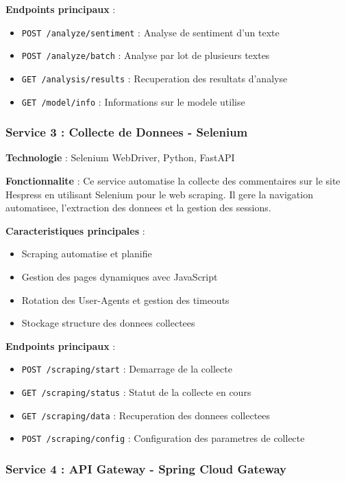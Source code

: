 \textbf{Endpoints principaux} :
\begin{itemize}
    \item \texttt{POST /analyze/sentiment} : Analyse de sentiment d'un texte
    \item \texttt{POST /analyze/batch} : Analyse par lot de plusieurs textes
    \item \texttt{GET /analysis/results} : Recuperation des resultats d'analyse
    \item \texttt{GET /model/info} : Informations sur le modele utilise
\end{itemize}

\subsubsection{Service 3 : Collecte de Donnees - Selenium}

\textbf{Technologie} : Selenium WebDriver, Python, FastAPI

\textbf{Fonctionnalite} : Ce service automatise la collecte des commentaires sur le site Hespress en utilisant Selenium pour le web scraping. Il gere la navigation automatisee, l'extraction des donnees et la gestion des sessions.

\textbf{Caracteristiques principales} :
\begin{itemize}
    \item Scraping automatise et planifie
    \item Gestion des pages dynamiques avec JavaScript
    \item Rotation des User-Agents et gestion des timeouts
    \item Stockage structure des donnees collectees
\end{itemize}

\textbf{Endpoints principaux} :
\begin{itemize}
    \item \texttt{POST /scraping/start} : Demarrage de la collecte
    \item \texttt{GET /scraping/status} : Statut de la collecte en cours
    \item \texttt{GET /scraping/data} : Recuperation des donnees collectees
    \item \texttt{POST /scraping/config} : Configuration des parametres de collecte
\end{itemize}

\subsubsection{Service 4 : API Gateway - Spring Cloud Gateway}

